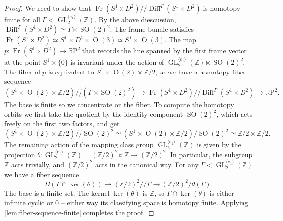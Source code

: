 \documentclass{amsart}
\theoremstyle{plain}
\theoremstyle{definition}
\DeclareMathOperator\Diff{Diff}
\DeclareMathOperator\SO{SO}
\DeclareMathOperator\Or{O}
\DeclareMathOperator\GL{GL}
\DeclareMathOperator\Fr{Fr}
\newcommand{\hq}{/\!\!/} %
\newcommand{\bbZ}{\mathbb{Z}}
\newcommand{\RP}{\mathbb{R}\mathrm{P}}
\newcommand{\Z}{\mathbb{Z}}
\begin{document}
\begin{proof}
    We need to show that $\Fr(S^1 \times D^2) \hq \Diff^\Gamma(S^1 \times D^2)$ is homotopy finite for all $\Gamma < \GL_2^{\langle e_1\rangle}(\bbZ)$. By the above diescussion, $\Diff^\Gamma(S^1 \times D^2)\simeq \Gamma \ltimes \SO(2)^2$.
    The frame bundle satisfies
    \( \Fr(S^1 \times D^2) \simeq S^1\times D^2 \times \Or(3) \simeq S^1 \times \Or(3) \).
    The map $p\colon \Fr(S^1 \times D^2) \to \RP^2$ that records the line spanned by the first frame vector at the point $S^1 \times \{0\}$ is invariant under the action of $\GL_2^{\langle e_1\rangle}(\Z) \ltimes \SO(2)^2$.
    The fiber of $p$ is equivalent to $S^1 \times \Or(2) \times \bbZ/2$, so we have a homotopy fiber sequence
    \[
        (S^1 \times \Or(2) \times \bbZ/2) \hq (\Gamma \ltimes \SO(2)^2)
        \longrightarrow \Fr(S^1 \times D^2) \hq \Diff^\Gamma(S^1 \times D^2)
        \longrightarrow \RP^2.
    \]
    The base is finite so we concentrate on the fiber.
    To compute the homotopy orbits we first take the quotient by the identity component $\SO(2)^2$, which acts freely on the first two factors, and get 
    \[
        (S^1 \times \Or(2) \times \bbZ/2) \hq \SO(2)^2 \simeq(S^1 \times \Or(2) \times \bbZ/2) / \SO(2)^2
        \simeq \bbZ/2 \times \bbZ/2.
    \]
    The remaining action of the mapping class group $\GL_2^{\langle e_1\rangle}(\Z)$ is given by the projection $\theta\colon \GL_2^{\langle e_1\rangle}(\Z) = (\bbZ/2)^2 \ltimes \bbZ \to (\bbZ/2)^2$.
    In particular, the subgroup $\bbZ$ acts trivially, and $(\bbZ/2)^2$ acts in the canonical way.
    For any $\Gamma < \GL_2^{\langle e_1\rangle}(\Z)$ we have a fiber sequence
    \[
        B(\Gamma \cap \ker(\theta)) \longrightarrow
        (\bbZ/2)^2 \hq \Gamma \longrightarrow
        (\bbZ/2)^2/\theta(\Gamma).
    \]
    The base is a finite set.
    The kernel $\ker(\theta)$ is $\bbZ$, so $\Gamma \cap \ker(\theta)$ is either infinite cyclic or $0$ -- either way its classifying space is homotopy finite. Applying \cref{lem:fiber-sequence-finite} completes the proof.
\end{proof}
\end{document}
